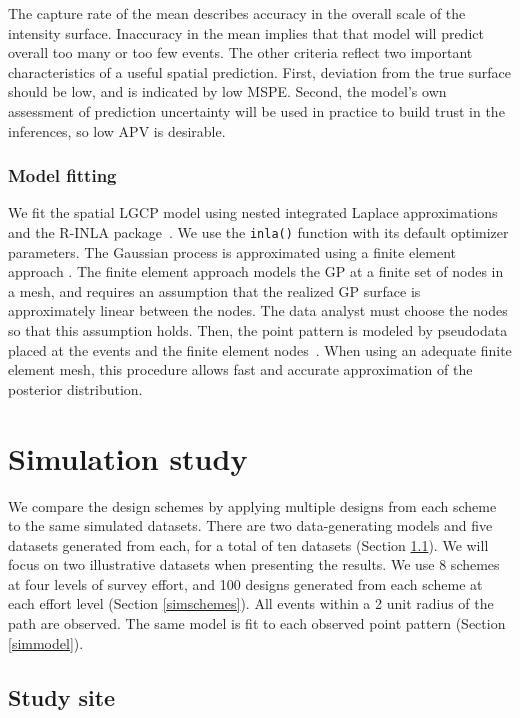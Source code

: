 \documentclass[review]{elsarticle}
\begin{document}
The capture rate of the mean describes accuracy in the overall scale of the
intensity surface. Inaccuracy in the mean implies that that model will predict
overall too many or too few events. The other criteria reflect two important
characteristics of a useful spatial prediction. First, deviation from the true
surface should be low, and is indicated by low MSPE. Second, the model's own
assessment of prediction uncertainty will be used in practice to build trust in
the inferences, so low APV is desirable. 


\subsubsection{Model fitting}

We fit the spatial LGCP model using nested integrated Laplace approximations
and the R-INLA package~\citep{rueetal,rinla}. We use the \texttt{inla()}
function with its default optimizer parameters. The Gaussian process is
approximated using a finite element approach \citep{lindgrenetal}. The finite
element approach models the GP at a finite set of nodes in a mesh, and requires
an assumption that the realized GP surface is approximately linear between the
nodes. The data analyst must choose the nodes so that this assumption holds.
Then, the point pattern is modeled by pseudodata placed at the events and the
finite element nodes~\citep{simpsonetal}. When using an adequate finite element
mesh, this procedure allows fast and accurate approximation of the posterior
distribution.%


\section{Simulation study}

We compare the design schemes by applying multiple designs from each scheme
to the same simulated datasets. There are two data-generating models and five
datasets generated from each, for a total of ten datasets
(Section \ref{simsite}). We will focus on two illustrative datasets when
presenting the results. We use 8 schemes at four levels of survey effort, and
100 designs generated from each scheme at each effort level
(Section \ref{simschemes}). All events within a 2 unit radius of the path are
observed. The same model is fit to each observed point pattern
(Section \ref{simmodel}).



\subsection{Study site}
\label{simsite}
\end{document}
